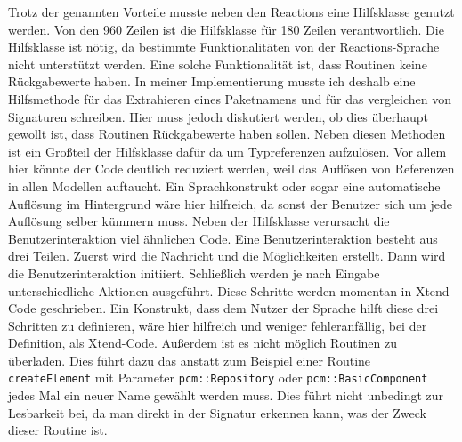 \documentclass[ngerman,runningheads]{llncs}
\begin{document}
Trotz der genannten Vorteile musste neben den Reactions eine Hilfsklasse genutzt werden. Von den 960 Zeilen ist die Hilfsklasse für 180 Zeilen verantwortlich. Die Hilfsklasse ist nötig, da bestimmte Funktionalitäten von der Reactions-Sprache nicht unterstützt werden. Eine solche Funktionalität ist, dass Routinen keine Rückgabewerte haben. In meiner Implementierung musste ich deshalb eine Hilfsmethode für das Extrahieren eines Paketnamens und für das vergleichen von Signaturen schreiben. Hier muss jedoch diskutiert werden, ob dies überhaupt gewollt ist, dass Routinen Rückgabewerte haben sollen. Neben diesen Methoden ist ein Großteil der Hilfsklasse dafür da um Typreferenzen aufzulösen. Vor allem hier könnte der Code deutlich reduziert werden, weil das Auflösen von Referenzen in allen Modellen auftaucht. Ein Sprachkonstrukt oder sogar eine automatische Auflösung im Hintergrund wäre hier hilfreich, da sonst der Benutzer sich um jede Auflösung selber kümmern muss. Neben der Hilfsklasse verursacht die Benutzerinteraktion viel ähnlichen Code. Eine Benutzerinteraktion besteht aus drei Teilen. Zuerst wird die Nachricht und die Möglichkeiten erstellt. Dann wird die Benutzerinteraktion initiiert. Schließlich werden je nach Eingabe unterschiedliche Aktionen ausgeführt. Diese Schritte werden momentan in Xtend-Code geschrieben. Ein Konstrukt, dass dem Nutzer der Sprache hilft diese drei Schritten zu definieren, wäre hier hilfreich und weniger fehleranfällig, bei der Definition, als Xtend-Code. Außerdem ist es nicht möglich Routinen zu überladen. Dies führt dazu das anstatt zum Beispiel einer Routine \texttt{createElement} mit Parameter \texttt{pcm::Repository} oder \texttt{pcm::BasicComponent} jedes Mal ein neuer Name gewählt werden muss. Dies führt nicht unbedingt zur Lesbarkeit bei, da man direkt in der Signatur erkennen kann, was der Zweck dieser Routine ist. \par
\end{document}
